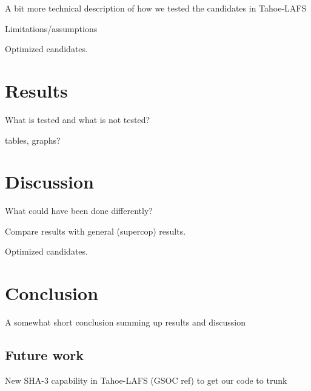 \documentclass[english,12pt,a4paper]{book}
\begin{document}
A bit more technical description of how we tested the candidates in Tahoe-LAFS

Limitations/assumptions

Optimized candidates.


\chapter{Results}

What is tested and what is not tested?

tables, graphs?


\chapter{Discussion}

What could have been done differently?

Compare results with general (supercop) results.

Optimized candidates.

\cite{s_nistround2}


\chapter{Conclusion}

A somewhat short conclusion summing up results and discussion

\section{Future work}

New SHA-3 capability in Tahoe-LAFS (GSOC ref) to get our code to trunk





\appendix
\appendixpage
\addappheadtotoc

\end{document}
